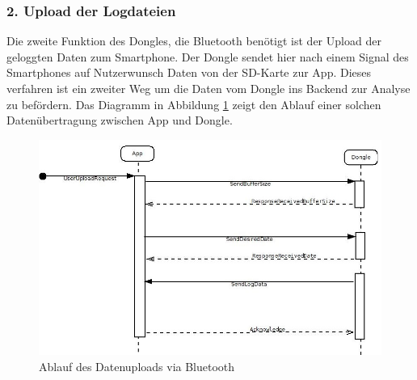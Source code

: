 \subsubsection*{2. Upload der Logdateien}
Die zweite Funktion des Dongles, die Bluetooth benötigt ist der Upload der geloggten Daten zum Smartphone. Der Dongle sendet hier nach einem Signal des Smartphones auf Nutzerwunsch Daten von der SD-Karte zur App. Dieses verfahren ist ein zweiter Weg um die Daten vom Dongle ins Backend zur Analyse zu befördern. Das Diagramm in Abbildung \ref{fig:DataUpload} zeigt den Ablauf einer solchen Datenübertragung zwischen App und Dongle. 
\begin{figure}[h]
  \begin{center}
    \includegraphics[scale=0.6]{./img/DataUploadSequence.jpg}
    \caption{Ablauf des Datenuploads via Bluetooth}
    \label{fig:DataUpload}
  \end{center}
\end{figure}

